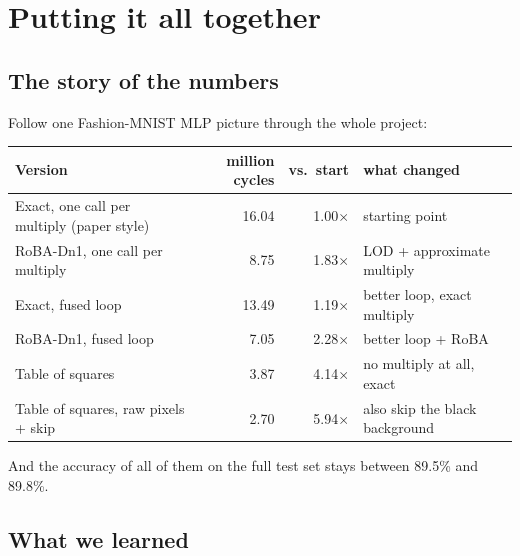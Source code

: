 \section{Putting it all together}\label{sec:wrap}

\subsection{The story of the numbers}

Follow one Fashion-MNIST MLP picture through the whole project:

\begin{center}
\small
\begin{tabular}{lrrl}
\toprule
Version & million cycles & vs.\ start & what changed\\
\midrule
Exact, one call per multiply (paper style) & 16.04 & 1.00$\times$ & starting point\\
RoBA-Dn1, one call per multiply & 8.75 & 1.83$\times$ & LOD + approximate multiply\\
Exact, fused loop & 13.49 & 1.19$\times$ & better loop, exact multiply\\
RoBA-Dn1, fused loop & 7.05 & 2.28$\times$ & better loop + RoBA\\
Table of squares & 3.87 & 4.14$\times$ & no multiply at all, exact\\
Table of squares, raw pixels + skip & 2.70 & 5.94$\times$ & also skip the black background\\
\bottomrule
\end{tabular}
\end{center}

And the accuracy of all of them on the full test set stays between 89.5\% and 89.8\%.

\subsection{What we learned}


